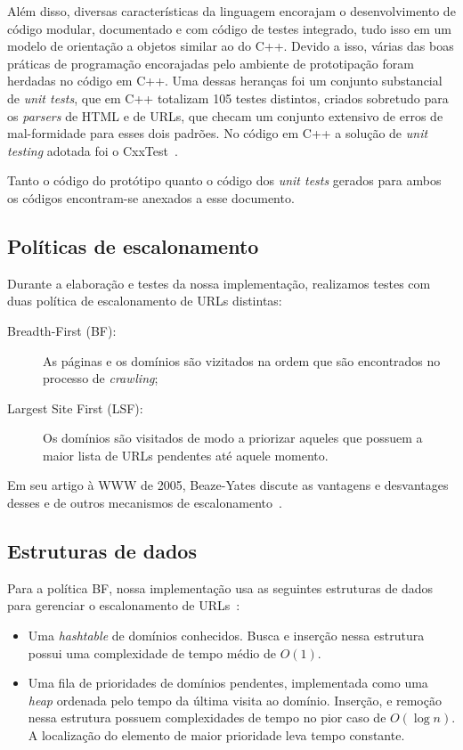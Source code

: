 \documentclass[10pt,twocolumn]{article}
\begin{document}
Além disso, diversas características da linguagem encorajam o
desenvolvimento de código modular, documentado e com código de testes
integrado, tudo isso em um modelo de orientação a objetos
similar ao do C++. Devido a isso, várias das boas práticas de
programação encorajadas pelo ambiente de prototipação foram herdadas no
código em C++. Uma dessas heranças foi um conjunto substancial de \emph{unit
tests}, que em C++ totalizam 105 testes distintos,
 criados sobretudo para os
\emph{parsers} de HTML e de URLs, que checam um conjunto extensivo de
erros de mal-formidade para esses dois padrões. No código em C++ a
solução de \emph{unit testing} adotada foi o CxxTest~\cite{cxxtest}.

Tanto o código do protótipo quanto o código dos \emph{unit tests} gerados para
ambos os códigos encontram-se anexados a esse documento.

\subsection{Políticas de escalonamento}

Durante a elaboração e testes da nossa implementação, realizamos testes
com duas política de escalonamento de URLs distintas:
\begin{description}
\item[Breadth-First (BF):] As páginas e os domínios são vizitados na ordem que
são encontrados no processo de \emph{crawling};
\item[Largest Site First (LSF):] Os domínios são visitados de modo a priorizar
aqueles que possuem a maior lista de URLs pendentes até aquele momento.
\end{description}

Em seu artigo à WWW de 2005, Beaze-Yates discute as vantagens e
desvantages desses e de outros mecanismos de
escalonamento~\cite{baezayates2005crawling}.



\subsection{Estruturas de dados}\label{sec:datastructures}

Para a política BF, nossa implementação usa as seguintes estruturas de
dados para gerenciar o escalonamento de URLs~\cite{cormen-algorithms}:

\begin{itemize}
\item Uma \emph{hashtable} de domínios conhecidos. Busca e inserção
nessa estrutura possui uma complexidade de tempo médio de \(O\left(1 
\right)\).
\item Uma fila de prioridades de domínios pendentes, implementada como
uma \emph{heap} ordenada pelo tempo da última visita ao domínio.
Inserção, e remoção nessa estrutura possuem
complexidades de tempo no pior caso de \(O\left(\log n\right)\). A
localização do elemento de maior prioridade leva tempo constante.
\end{itemize}
\end{document}
